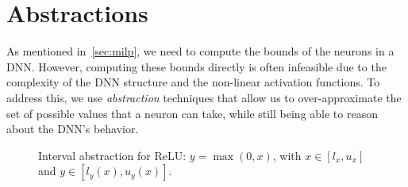 \documentclass[oneside,11pt,dvipsnames]{book}
\numberwithin{equation}{section}
\theoremstyle{definition}
\theoremstyle{remark}
\newcommand{\tvn}[1]{\iftoggle{usecomment}{{\color{red}{[TVN]: #1}}}{}}
\begin{document}
\chapter{Abstractions}\label{chap:abstractions}


As mentioned in~\autoref{sec:milp}, we need to compute the bounds of the neurons in a DNN. However, computing these bounds directly is often infeasible due to the complexity of the DNN structure and the non-linear activation functions. To address this, we use \emph{abstraction} techniques that allow us to over-approximate the set of possible values that a neuron can take, while still being able to reason about the DNN's behavior.


\tvn{Hai, put in the Tikz picture showing different abstractions: ReLU, Interval, Zonotope, Polytope, etc.}
\begin{figure}[h]
    \centering
    \caption{Interval abstraction for ReLU: $y = \max(0, x)$, with $x \in [l_x, u_x]$ and $y \in [l_y(x), u_y(x)]$.}
    \label{fig:relu-interval-abstraction}
\end{figure}
\end{document}
